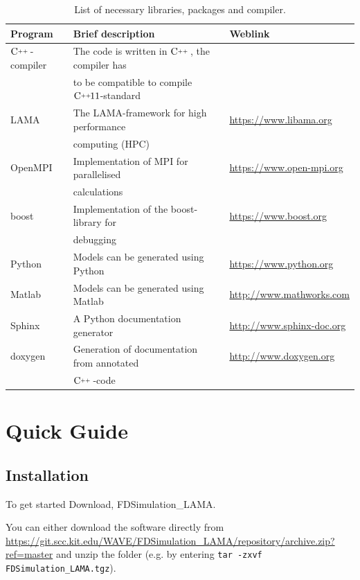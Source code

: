 \documentclass[pdftex,a4paper,parskip,listof=totoc,bibliography=totoc,onehalfspacing,12pt]{scrreprt}
\newcommand{\CC}[1][]{$\text{C\hspace{0ex}}^{_{_{_{++}}}}					%
                      \ifthenelse{\equal{#1}{}}{}{\text{\hspace{-.625ex}#1}}$}
\newcommand{\shellcmd}[1]{\indent\indent\texttt{#1}}	%
\begin{document}
\begin{table}[h!]
\caption{List of necessary libraries, packages and compiler.}\label{tab:pack}
\centering
\begin{adjustbox}{width=1\textwidth,center=\textwidth}
	\begin{tabular}{lll}
	\toprule
	Program & Brief description & Weblink \\
	\midrule
	\CC-compiler	& The code is written in \CC[], the compiler	has 		& \\
										& to be compatible to compile \CC[11]-standard					& \\
LAMA 				& The LAMA-framework for high performance			& \url{https://www.libama.org} \\
	& computing 	(HPC)							    & \\
	\midrule
	OpenMPI			& Implementation of MPI for parallelised  			& \url{https://www.open-mpi.org} \\
										& calculations						& \\
		boost					& Implementation of the boost-library	for  				& \url{https://www.boost.org}		\\
										& debugging																& \\										
	Python				& Models can be generated using Python 		& \url{https://www.python.org}\\
	Matlab				& Models can be generated using Matlab		& \url{http://www.mathworks.com}\\										
	Sphinx				& 	A Python documentation generator 							& \url{http://www.sphinx-doc.org}\\
	doxygen			& 	Generation of documentation from annotated				& \url{http://www.doxygen.org}\\
										& \CC-code 															& \\
	\bottomrule
	\end{tabular}
	\end{adjustbox}
\end{table}

\section{Quick Guide}

\subsection{Installation}
To get started Download, FDSimulation\_LAMA. 

You can either download the software directly from \url{https://git.scc.kit.edu/WAVE/FDSimulation_LAMA/repository/archive.zip?ref=master} and unzip the folder (e.g. by entering \shellcmd{tar -zxvf FDSimulation\_LAMA.tgz}).
\end{document}
